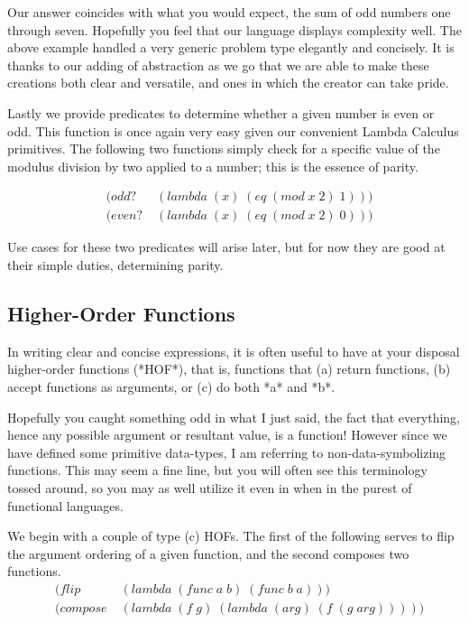 \documentclass[11pt]{article}
\begin{document}
Our answer coincides with what you would expect, the sum of odd numbers one through seven. Hopefully you feel that our language displays complexity well. The above example handled a very generic problem type elegantly and concisely. It is thanks to our adding of abstraction as we go that we are able to make these creations both clear and versatile, and ones in which the creator can take pride.

Lastly we provide predicates to determine whether a given number is even or odd. This function is once again very easy given our convenient Lambda Calculus primitives. The following two functions simply check for a specific value of the modulus division by two applied to a number; this is the essence of parity.

\begin{align*}
& (odd? \; &(lambda \; (x) \; (eq \; (mod \; x \; 2) \; 1)))
\\& (even? \; &(lambda \; (x) \; (eq \; (mod \; x \; 2) \; 0)))
\end{align*}

Use cases for these two predicates will arise later, but for now they are good at their simple duties, determining parity.

\subsection{Higher-Order Functions}
In writing clear and concise expressions, it is often useful to have at your disposal higher-order functions (*HOF*), that is, functions that (a) return functions, (b) accept functions as arguments, or (c) do both *a* and *b*.

Hopefully you caught something odd in what I just said, the fact that everything, hence any possible argument or resultant value, is a function! However since we have defined some primitive data-types, I am referring to non-data-symbolizing functions. This may seem a fine line, but you will often see this terminology tossed around, so you may as well utilize it even in when in the purest of functional languages.

We begin with a couple of type (c) HOFs. The first of the following serves to flip the argument ordering of a given function, and the second composes two functions.
\begin{align*}
& (flip \; &(lambda \; (func \; a \; b) \; (func \; b \; a)))
\\& (compose \; &(lambda \; (f \; g) \; (lambda \; (arg) \; (f \; (g \; arg)))))
\end{align*}
\end{document}
